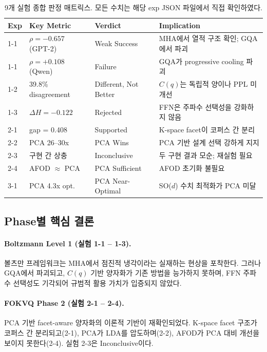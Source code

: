 \documentclass[11pt,a4paper]{article}
\begin{document}
\begin{table}[H]
\centering
\caption{9개 실험 종합 판정 매트릭스. 모든 수치는 해당 exp JSON 파일에서 직접 확인하였다.}
\label{tab:exec_verdict}
\begin{tabularx}{\textwidth}{ll>{\raggedright\arraybackslash}p{2.5cm}>{\raggedright\arraybackslash}X}
\toprule
\textbf{Exp} & \textbf{Key Metric} & \textbf{Verdict} & \textbf{Implication} \\
\midrule
1-1 & $\rho = -0.657$ (GPT-2) & \textcolor{partial}{Weak Success} & MHA에서 열적 구조 확인; GQA에서 파괴 \\
1-1 & $\rho = +0.108$ (Qwen) & \textcolor{failure}{Failure} & GQA가 progressive cooling 파괴 \\
1-2 & 39.8\% disagreement & \textcolor{partial}{Different, Not Better} & $C(q)$는 독립적 양이나 PPL 미개선 \\
1-3 & $\Delta H = -0.122$ & \textcolor{failure}{Rejected} & FFN은 주파수 선택성을 강화하지 않음 \\
2-1 & gap = 0.408 & \textcolor{success}{Supported} & K-space facet이 코퍼스 간 분리 \\
2-2 & PCA 26--30x & \textcolor{success}{PCA Wins} & PCA 기반 설계 선택 강하게 지지 \\
2-3 & 구현 간 상충 & \textcolor{inconclusive}{Inconclusive} & 두 구현 결과 모순; 재실험 필요 \\
2-4 & AFOD $\approx$ PCA & \textcolor{success}{PCA Sufficient} & AFOD 초기화 불필요 \\
3-1 & PCA 4.3x opt. & \textcolor{success}{PCA Near-Optimal} & SO($d$) 수치 최적화가 PCA 미달 \\
\bottomrule
\end{tabularx}
\end{table}

\subsection{Phase별 핵심 결론}

\paragraph{Boltzmann Level 1 (실험 1-1 -- 1-3).}
볼츠만 프레임워크는 MHA에서 점진적 냉각이라는 실재하는 현상을 포착한다.
그러나 GQA에서 파괴되고, $C(q)$ 기반 양자화가 기존 방법을 능가하지 못하며, FFN 주파수 선택성도 기각되어 규범적 활용 가치가 입증되지 않았다.

\paragraph{FOKVQ Phase 2 (실험 2-1 -- 2-4).}
PCA 기반 facet-aware 양자화의 이론적 기반이 재확인되었다.
K-space facet 구조가 코퍼스 간 분리되고(2-1), PCA가 LDA를 압도하며(2-2), AFOD가 PCA 대비 개선을 보이지 못한다(2-4).
실험 2-3은 Inconclusive이다.
\end{document}
